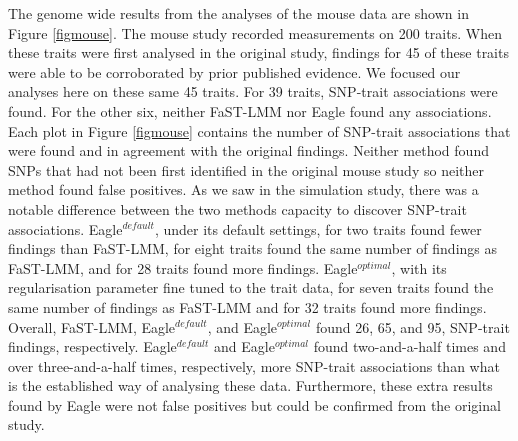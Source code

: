 \documentclass{nature}
\begin{document}
The genome wide results from the analyses of the mouse data are shown in Figure  \ref{figmouse}. The mouse study recorded
measurements on 200 traits. When these traits were first analysed in the original study, findings for 45 of these traits were able to be 
corroborated by prior published evidence. We focused our analyses here on these same 45 traits. For 39 traits, SNP-trait associations 
were found. For the other six, neither FaST-LMM nor Eagle found any associations. 
Each plot in Figure  \ref{figmouse} contains the number of SNP-trait associations that were found and in agreement with the original findings. 
Neither method found SNPs that had not been first identified in the original mouse study so neither method found false positives. 
As we saw in the simulation study, there was a notable difference between the two methods capacity to discover SNP-trait associations. Eagle$^{default}$, under its default settings, for two traits found fewer findings than FaST-LMM, for eight traits found the same number 
of findings as FaST-LMM, and for 28 traits found more findings. Eagle$^{optimal}$, 
with its regularisation parameter fine tuned to the trait data, for seven traits found the same number of findings as FaST-LMM and for 32 traits found more findings. Overall, FaST-LMM, Eagle$^{default}$, and Eagle$^{optimal}$ found 26, 65, and 95, SNP-trait findings, respectively. 
Eagle$^{default}$ and Eagle$^{optimal}$ found two-and-a-half times and over three-and-a-half times, respectively, more SNP-trait 
associations than what is the established way of analysing these data. Furthermore, these extra results found by Eagle were not 
false positives but could be confirmed from the original study. 
\end{document}
